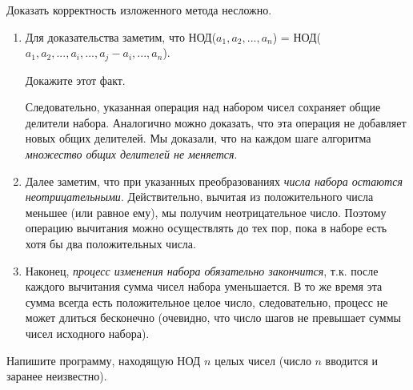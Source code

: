 
\noindent Доказать корректность изложенного метода несложно.

\begin{dok}
    \begin{enumerate}[noitemsep] 
        \item Для доказательства заметим, что НОД($a_1, a_2, ..., a_n$) = НОД($a_1, a_2, ..., a_i, ..., a_j - a_i, ..., a_n$).
            \begin{ex}
                Докажите этот факт.
            \end{ex}
            Следовательно, указанная операция над набором чисел сохраняет общие делители набора. Аналогично можно доказать, что эта операция не добавляет новых общих делителей. Мы доказали, что на каждом шаге алгоритма \textit{множество общих делителей не меняется}.
        \item Далее заметим, что при указанных преобразованиях \textit{числа набора остаются неотрицательными}. Действительно, вычитая из положительного числа меньшее (или равное ему), мы получим неотрицательное число. Поэтому операцию вычитания можно осуществлять до тех пор, пока в наборе есть хотя бы два положительных числа.
        \item Наконец, \textit{процесс изменения набора обязательно закончится}, т.к. после каждого вычитания сумма чисел набора уменьшается. В то же время эта сумма всегда есть положительное целое число, следовательно, процесс не может длиться бесконечно (очевидно, что число шагов не превышает суммы чисел исходного набора).
    \end{enumerate}
    
\end{dok}

\begin{exP}
    Напишите программу, находящую НОД $n$ целых чисел (число $n$ вводится и заранее неизвестно).
\end{exP}